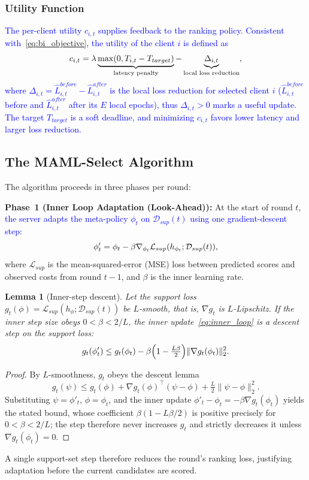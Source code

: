 \documentclass[journal]{IEEEtran}
\newtheorem{Lemma}{Lemma}
\newcommand{\revision}[1]{\textcolor{blue}{#1}}
\begin{document}
\subsubsection{Utility Function}
\revision{The per-client utility $c_{i,t}$ supplies feedback to the ranking policy. Consistent with~\eqref{eq:bi_objective}, the utility of the client $i$ is defined as}
\begin{equation}
	\color{black}
	c_{i,t} = \lambda \underbrace{\max(0, T_{i,t} - T_{target})}_{\text{latency penalty}} - \underbrace{\Delta_{i,t}}_{\text{local loss reduction}},
	\label{eq:cost}
\end{equation}
\revision{where $\Delta_{i,t}=\hat{L}_{i,t}^{before}-\hat{L}_{i,t}^{after}$ is the local loss reduction for selected client $i$ ($\hat{L}_{i,t}^{before}$ before and $\hat{L}_{i,t}^{after}$ after its $E$ local epochs), thus $\Delta_{i,t}>0$ marks a useful update. %
The target $T_{target}$ is a soft deadline, and minimizing $c_{i,t}$ favors lower latency and larger loss reduction.}

\subsection{The MAML-Select Algorithm}
The algorithm proceeds in three phases per round:

\textbf{Phase~1 (Inner Loop Adaptation (Look-Ahead)):}
At the start of round $t$, \revision{the server adapts the meta-policy $\phi_t$ on $\mathcal{D}_{sup}(t)$ using one gradient-descent step:}
\begin{equation}
	\color{black}
		\phi'_t = \phi_t - \beta \nabla_{\phi_t} \mathcal{L}_{sup}(h_{\phi_t};\mathcal{D}_{sup}(t)),
		\label{eq:inner_loop}
\end{equation}
where $\mathcal{L}_{sup}$ is the mean-squared-error (MSE) loss between predicted scores and observed costs from round $t-1$, and $\beta$ is the inner learning rate.

{\color{black}
\begin{Lemma}[Inner-step descent]\label{stmt:inner}
Let the support loss $g_t(\phi)=\mathcal{L}_{sup}(h_\phi;\mathcal{D}_{sup}(t))$ be $L$-smooth, that is, $\nabla g_t$ is $L$-Lipschitz. If the inner step size obeys $0<\beta<2/L$, the inner update~\eqref{eq:inner_loop} is a descent step on the support loss:
\[
g_t(\phi'_t)\le g_t(\phi_t)-\beta\Bigl(1-\tfrac{L\beta}{2}\Bigr)\lVert\nabla g_t(\phi_t)\rVert_2^2 .
\]
\end{Lemma}
\begin{proof}
By $L$-smoothness, $g_t$ obeys the descent lemma
\[
g_t(\psi)\le g_t(\phi)+\nabla g_t(\phi)^{\top}(\psi-\phi)+\tfrac{L}{2}\lVert\psi-\phi\rVert_2^2 .
\]
Substituting $\psi=\phi'_t$, $\phi=\phi_t$, and the inner update $\phi'_t-\phi_t=-\beta\nabla g_t(\phi_t)$ yields the stated bound, whose coefficient $\beta(1-L\beta/2)$ is positive precisely for $0<\beta<2/L$; the step therefore never increases $g_t$ and strictly decreases it unless $\nabla g_t(\phi_t)=0$.
\end{proof}
A single support-set step therefore reduces the round's ranking loss, justifying adaptation before the current candidates are scored.
}
\end{document}

